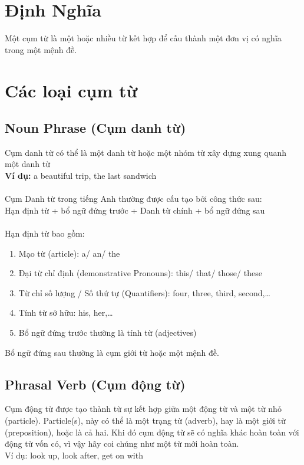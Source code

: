 
\chapter{Định Nghĩa}
Một cụm từ là một hoặc nhiều từ kết hợp để cấu thành một đơn vị có nghĩa trong một mệnh đề.

\chapter{Các loại cụm từ}
\section{Noun Phrase (Cụm danh từ)}
Cụm danh từ có thể là một danh từ hoặc một nhóm từ xây dựng xung quanh một danh từ\\
\textbf{Ví dụ:} a beautiful trip, the last sandwich\\\\
Cụm Danh từ trong tiếng Anh thường được cấu tạo bởi công thức sau:\\
Hạn định từ + bổ ngữ đứng trước + Danh từ chính + bổ ngữ đứng sau\\\\

Hạn định từ bao gồm:
\begin{enumerate}
    \item Mạo từ (article): a/ an/ the
    \item Đại từ chỉ định (demonstrative Pronouns): this/ that/ those/ these
    \item Từ chỉ số lượng / Số thứ tự (Quantifiers): four, three, third, second,…
    \item Tính từ sở hữu: his, her,…
    \item Bổ ngữ đứng trước thường là tính từ (adjectives)
\end{enumerate}
Bổ ngữ đứng sau thường là cụm giới từ hoặc một mệnh đề.

\section{Phrasal Verb (Cụm động từ)}
Cụm động từ được tạo thành từ sự kết hợp giữa một động từ và một từ nhỏ (particle). Particle(s), này có thể là một trạng từ (adverb), hay là một giới từ (preposition), hoặc là cả hai. 
Khi đó cụm động từ sẽ có nghĩa khác hoàn toàn với động từ vốn có, vì vậy hãy coi chúng như một từ mới hoàn toàn.
\\Ví dụ: look up, look after, get on with